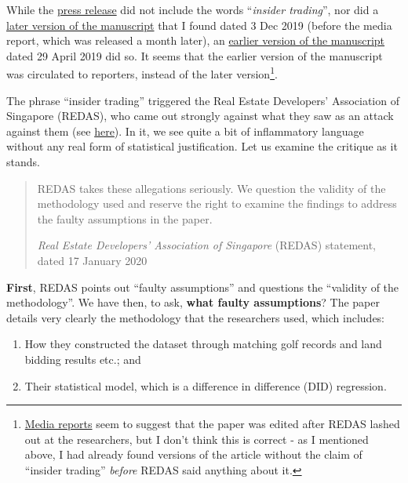 \documentclass[openany]{book}
\providecommand{\tightlist}{%
  \setlength{\itemsep}{0pt}\setlength{\parskip}{0pt}}
\let\rmarkdownfootnote\footnote%
\def\footnote{\protect\rmarkdownfootnote}
\begin{document}
While the
\href{https://bschool.nus.edu.sg/media/press-release-details/636/}{press
release} did not include the words ``\emph{insider trading}'', nor did a
\href{https://www.arx.cfa/-/media/regional/arx/post-pdf/2019/12/24/afbc-2019-golfing-for-information.ashx}{later
version of the manuscript} that I found dated 3 Dec 2019 (before the
media report, which was released a month later), an
\href{https://editorialexpress.com/cgi-bin/conference/download.cgi?db_name=AFAPS2020\&paper_id=234}{earlier
version of the manuscript} dated 29 April 2019 did so. It seems that the
earlier version of the manuscript was circulated to reporters, instead
of the later version\footnote{\href{https://www.todayonline.com/singapore/nus-researchers-drop-claim-insider-trading-among-real-estate-executives-golf-course}{Media
  reports} seem to suggest that the paper was edited after REDAS lashed
  out at the researchers, but I don't think this is correct - as I
  mentioned above, I had already found versions of the article without
  the claim of ``insider trading'' \emph{before} REDAS said anything
  about it.}.

The phrase ``insider trading'' triggered the Real Estate Developers'
Association of Singapore (REDAS), who came out strongly against what
they saw as an attack against them (see
\href{https://www.redas.com/assets/files/press\%20release/2019/REDAS_Response_NUS_Study_on_Link.pdf}{here}).
In it, we see quite a bit of inflammatory language without any real form
of statistical justification. Let us examine the critique as it stands.

\begin{quote}
REDAS takes these allegations seriously. We question the validity of the
methodology used and reserve the right to examine the findings to
address the faulty assumptions in the paper.

\emph{Real Estate Developers' Association of Singapore} (REDAS)
statement, dated 17 January 2020
\end{quote}

\textbf{First}, REDAS points out ``faulty assumptions'' and questions
the ``validity of the methodology''. We have then, to ask, \textbf{what
faulty assumptions}? The paper details very clearly the methodology that
the researchers used, which includes:

\begin{enumerate}
\def\labelenumi{\arabic{enumi}.}
\tightlist
\item
  How they constructed the dataset through matching golf records and
  land bidding results etc.; and
\item
  Their statistical model, which is a difference in difference (DID)
  regression.
\end{enumerate}
\end{document}
